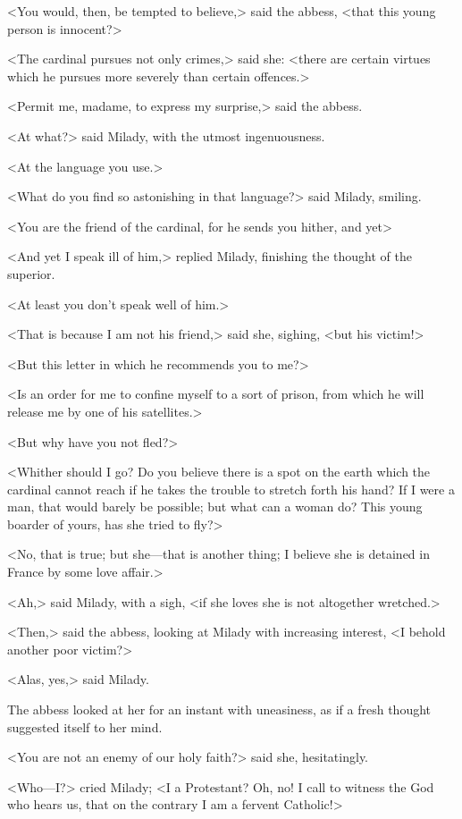 <You would, then, be tempted to believe,> said the abbess, <that this young person is innocent?> 

<The cardinal pursues not only crimes,> said she: <there are certain virtues which he pursues more severely than certain offences.> 

<Permit me, madame, to express my surprise,> said the abbess. 

<At what?> said Milady, with the utmost ingenuousness. 

<At the language you use.> 

<What do you find so astonishing in that language?> said Milady, smiling. 

<You are the friend of the cardinal, for he sends you hither, and yet\longdash> 

<And yet I speak ill of him,> replied Milady, finishing the thought of the superior. 

<At least you don't speak well of him.> 

<That is because I am not his friend,> said she, sighing, <but his victim!> 

<But this letter in which he recommends you to me?> 

<Is an order for me to confine myself to a sort of prison, from which he will release me by one of his satellites.> 

<But why have you not fled?> 

<Whither should I go? Do you believe there is a spot on the earth which the cardinal cannot reach if he takes the trouble to stretch forth his hand? If I were a man, that would barely be possible; but what can a woman do? This young boarder of yours, has she tried to fly?> 

<No, that is true; but she—that is another thing; I believe she is detained in France by some love affair.> 

<Ah,> said Milady, with a sigh, <if she loves she is not altogether wretched.> 

<Then,> said the abbess, looking at Milady with increasing interest, <I behold another poor victim?> 

<Alas, yes,> said Milady. 

The abbess looked at her for an instant with uneasiness, as if a fresh thought suggested itself to her mind. 

<You are not an enemy of our holy faith?> said she, hesitatingly. 

<Who—I?> cried Milady; <I a Protestant? Oh, no! I call to witness the God who hears us, that on the contrary I am a fervent Catholic!> 

